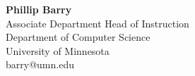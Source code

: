 
\textbf{Phillip Barry}\\
\hspace*{0.25cm} Associate Department Head of Instruction\\
\hspace*{0.25cm} Department of Computer Science\\
\hspace*{0.25cm} University of Minnesota\\
\hspace*{0.25cm} barry@umn.edu

\label{references_last}

